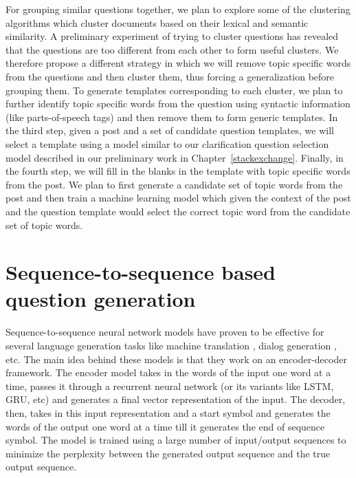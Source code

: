 \documentclass[11pt]{report}
\renewcommand\cite{\citep}	%
\begin{document}
\noindent
For grouping similar questions together, we plan to explore some of the clustering algorithms which cluster documents based on their lexical and semantic similarity. A preliminary experiment of trying to cluster questions has revealed that the questions are too different from each other to form useful clusters. We therefore propose a different strategy in which we will remove topic specific words from the questions and then cluster them, thus forcing a generalization before grouping them. To generate templates corresponding to each cluster, we plan to further identify topic specific words from the question using syntactic information (like parts-of-speech tags) and then remove them to form generic templates. In the third step, given a post and a set of candidate question templates, we will select a template using a model similar to our clarification question selection model described in our preliminary work in Chapter~\ref{stackexchange}. Finally, in the fourth step, we will fill in the blanks in the template with topic specific words from the post. We plan to first generate a candidate set of topic words from the post and then train a machine learning model which given the context of the post and the question template would select the correct topic word from the candidate set of topic words.

\newpage
\section{Sequence-to-sequence based question generation}

Sequence-to-sequence neural network models have proven to be effective for several language generation tasks like machine translation \cite{sutskever2014sequence}, dialog generation \cite{serban2015building}, etc. The main idea behind these models is that they work on an encoder-decoder framework. The encoder model takes in the words of the input one word at a time, passes it through a recurrent neural network (or its variants like LSTM, GRU, etc) and generates a final vector representation of the input. The decoder, then, takes in this input representation and a start symbol and generates the words of the output one word at a time till it generates the end of sequence symbol. The model is trained using a large number of input/output sequences to minimize the perplexity between the generated output sequence and the true output sequence.\\
\end{document}

